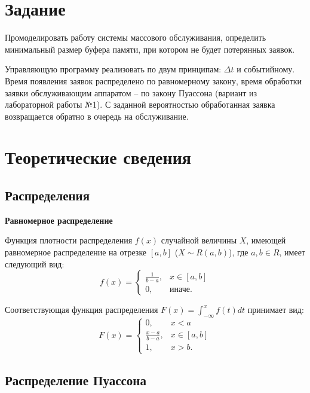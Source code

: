 \documentclass[14pt, a4paper]{extarticle}
\begin{document}


\setcounter{page}{2}

\section{Задание}

Промоделировать работу системы массового обслуживания, определить минимальный размер буфера памяти, при котором не будет потерянных заявок. 

Управляющую программу реализовать по двум принципам: $\Delta t$ и событийному. Время появления заявок распределено по равномерному закону, время обработки заявки обслуживающим аппаратом -- по закону Пуассона (вариант из лабораторной работы №1). С заданной вероятностью обработанная заявка возвращается обратно в очередь на обслуживание.



\section{Теоретические сведения}

\subsection{Распределения}

\textbf{Равномерное распределение}

Функция плотности распределения $f(x)$ случайной величины $X$, имеющей равномерное распределение на отрезке $[a, b]$ ($X \sim R(a, b)$), где $a, b \in R$, имеет следующий вид:
\begin{equation}
	f(x)=\begin{cases}
		\frac{1}{b - a}, & x \in [a, b] \\
		0, & \text{иначе}.
	\end{cases}
\end{equation}

Соответствующая функция распределения $F(x) = \int_{-\infty}^{x}f(t)dt$ принимает вид: 
\begin{equation}
	F(x)=\begin{cases}
		0, & x < a \\
		\frac{x - a}{b - a}, & x \in [a, b] \\
		1, & x > b.
	\end{cases}
\end{equation}


\subsection{Распределение Пуассона}
\end{document}
